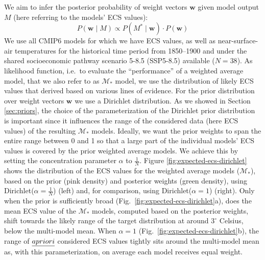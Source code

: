We aim to infer the posterior probability of weight vectors $\mathbf{w}$ given model output $M$ (here referring to the models' ECS values):
%
\begin{equation}
    P(\mathbf{w}\mid M) \propto P(M^*\mid \mathbf{w}) \cdot P(\mathbf{w})
\end{equation}
%
We use all CMIP6 models for which we have ECS values, as well as near-surface-air temperatures for the historical time period from 1850--1900 and under the shared socioeconomic pathway scenario 5-8.5 (SSP5-8.5) available ($N=38$). %
As likelihood function, i.e.~to evaluate the ``performance'' of a weighted average model, that we also refer to as $\mathcal{M}_*$ model, we use the distribution of likely ECS values that \citet{sherwoodAssessmentEarthsClimate2020} derived based on various lines of evidence.
For the prior distribution over weight vectors $\mathbf{w}$ we use a Dirichlet distribution. As we showed in Section \ref{sec:priors}, the choice of the parameterization of the Dirichlet prior distribution is important since it influences the range of the considered data (here ECS values) of the resulting $\mathcal{M}_*$ models.
Ideally, we want the prior weights to span the entire range between 0 and 1 so that a large part of the individual models' ECS values is covered by the prior weighted average models. We achieve this by setting the concentration parameter $\alpha$ to $\frac{1}{N}$. Figure \ref{fig:expected-ecs-dirichlet} shows the distribution of the ECS values for the weighted average models ($\mathcal{M}_*$), based on the prior (pink density) and posterior weights (green density), using Dirichlet($\alpha=\frac{1}{N}$) (left) and, for comparison, using Dirichlet($\alpha=1$) (right). 
Only when the prior is sufficiently broad (Fig.~\ref{fig:expected-ecs-dirichlet}a), does the mean ECS value of the $\mathcal{M}_*$ models, computed based on the posterior weights, shift towards the likely range of the target distribution at around $3^\circ$ Celsius, below the multi-model mean.
When $\alpha = 1$ (Fig.~\ref{fig:expected-ecs-dirichlet}b), the range of $\emph{a priori}$ considered ECS values tightly sits around the multi-model mean as, with this parameterization, on average each model receives equal weight. 



